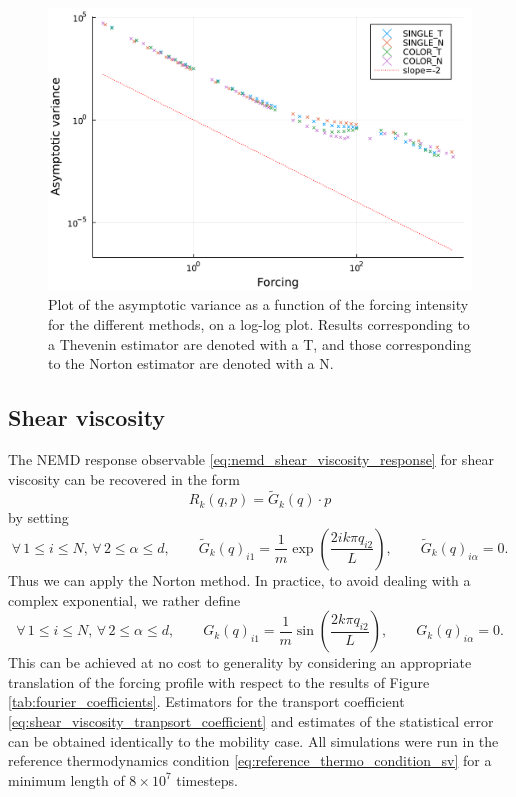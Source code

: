   \begin{figure}[htbp]
    \begin{center}
      \includegraphics[width=0.7\linewidth]{figures/asymptotic_vars_mobility.pdf}
      \caption{ \label{fig:norton_avs}
       Plot of the asymptotic variance as a function of the forcing intensity for the different methods, on a log-log plot.
       Results corresponding to a Thevenin estimator are denoted with a T, and those corresponding to the Norton estimator are denoted with a N. 
      }
    \end{center}
  \end{figure}

\subsection{Shear viscosity}
The NEMD response observable \eqref{eq:nemd_shear_viscosity_response} for shear viscosity can be recovered in the form 
\[R_k(q,p)= \widetilde{G}_k(q)\cdot p\]
 by setting
\begin{equation}
    \label{eq:shear_viscosity_response_alt}
    \forall\, 1\leq i\leq N,\,\forall\, 2\leq \alpha\leq d,\qquad \widetilde{G}_k(q)_{i1}=\frac{1}{m}\exp\left(\frac{2ik\pi q_{i2}}{L}\right),\qquad \widetilde{G}_k(q)_{i\alpha}=0.
\end{equation}
Thus we can apply the Norton method. In practice, to avoid dealing with a complex exponential, we rather define
\begin{equation}
    \label{eq:shear_viscosity_response}
    \forall\, 1\leq i\leq N,\,\forall\, 2\leq \alpha\leq d,\qquad G_k(q)_{i1}=\frac{1}{m}\sin\left(\frac{2k\pi q_{i2}}{L}\right),\qquad G_k(q)_{i\alpha}=0.
\end{equation}
This can be achieved at no cost to generality by considering an appropriate translation of the forcing profile with respect to the results of Figure \ref{tab:fourier_coefficients}.
Estimators for the transport coefficient \eqref{eq:shear_viscosity_tranpsort_coefficient} and estimates of the statistical error can be obtained identically to the mobility case.
All simulations were run in the reference thermodynamics condition \eqref{eq:reference_thermo_condition_sv} for a minimum length of $8\times 10^7$ timesteps.

